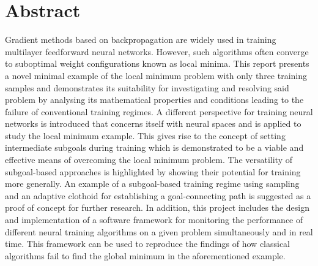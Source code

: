 \chapter*{Abstract}
Gradient methods based on backpropagation are widely used in training multilayer feedforward neural networks. 
However, such algorithms often converge to suboptimal weight configurations known as local minima. 
This report presents a novel minimal example of the local minimum problem with only three training samples and demonstrates its suitability for investigating and resolving said problem by analysing its mathematical properties and conditions leading to the failure of conventional training regimes. 
A different perspective for training neural networks is introduced that concerns itself with neural spaces and is applied to study the local minimum example.
This gives rise to the concept of setting intermediate subgoals during training which is demonstrated to be a viable and effective means of overcoming the local minimum problem. 
The versatility of subgoal-based approaches is highlighted by showing their potential for training more generally. 
An example of a subgoal-based training regime using sampling and an adaptive clothoid for establishing a goal-connecting path is suggested as a proof of concept for further research. 
In addition, this project includes the design and implementation of a software framework for monitoring the performance of different neural training algorithms on a given problem simultaneously and in real time. 
This framework can be used to reproduce the findings of how classical algorithms fail to find the global minimum in the aforementioned example.

